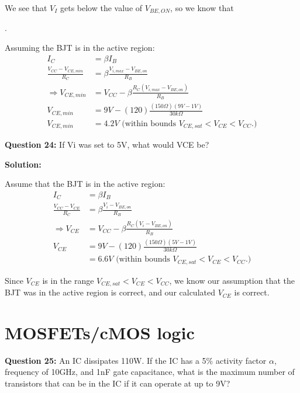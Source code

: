 \documentclass{article}
\begin{document}
We see that $V_I$ gets below the value of $V_{BE,ON}$, so we know that
\begin{center}
    .
\end{center}

Assuming the BJT is in the active region: 
\begin{align*}
    I_C &= \beta I_B \\
    \frac{V_{CC}-V_{CE,min}}{R_C} &= \beta \frac{V_{i,max} - V_{BE,on}}{R_B} \\
    \Rightarrow V_{CE,min} &= V_{CC} - \beta\frac{R_C(V_{i,max} - V_{BE,on})}{R_B} \\
    V_{CE,min} &= 9V - (120)\frac{(150\Omega)(9V-1V)}{30k\Omega} \\
    V_{CE,min}&= \boxed{4.2V} \text{ (within bounds } V_{CE,sat}<V_{CE}< V_{CC}. \text{)}
\end{align*} 

\vspace{5mm}

\textbf{Question 24:} If Vi was set to 5V, what would VCE be?

\textbf{Solution:}

Assume that the BJT is in the active region: 
\begin{align*}
    I_C &= \beta I_B \\
    \frac{V_{CC}-V_{CE}}{R_C} &= \beta \frac{V_i - V_{BE,on}}{R_B} \\
    \Rightarrow V_{CE} &= V_{CC} - \beta\frac{R_C(V_i - V_{BE,on})}{R_B} \\
    V_{CE} &= 9V - (120)\frac{(150\Omega)(5V-1V)}{30k\Omega} \\
    &= \boxed{6.6V} \text{ (within bounds } V_{CE,sat}<V_{CE}< V_{CC}. \text{)}
\end{align*}

Since $V_{CE}$ is in the range $V_{CE,sat} < V_{CE} < V_{CC}$, we know our assumption that the BJT was in the active region is correct, and our calculated $V_{CE}$ is correct.


\section*{MOSFETs/cMOS logic}
\textbf{Question 25:} An IC dissipates 110W. If the IC has a 5\% activity factor \(\alpha\), frequency of 10GHz, and 1nF gate capacitance, what is the maximum number of transistors that can be in the IC if it can operate at up to 9V?
\end{document}
